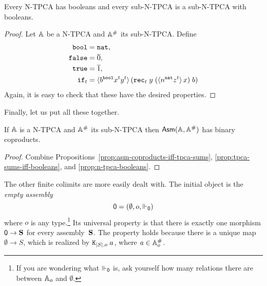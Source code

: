 \begin{proposition}
  \label{prop:n-tpca-booleans}
  Every N-TPCA has booleans and every sub-N-TPCA is a sub-N-TPCA with
  booleans.
\end{proposition}

\begin{proof}
  Let $\AA$ be a N-TPCA and $\compAA$ its sub-N-TPCA. Define
  \begin{align*}
    \ttbool &= \ttnat, \\
    \combFalse &= \numeral{0}, \\
    \combTrue &= \numeral{1}, \\
    \combIf_t &= \pcalam{\annot{b}{\ttbool}
                         \annot{x}{t}
                         \annot{y}{t}}{
                         \combRec_t \; y \;
                         (\xpcalam{\annot{n}{\ttnat} \annot{z}{t}}{x}) \; b 
                       }
  \end{align*}
  Again, it is easy to check that these have the desired properties.
\end{proof}

\noindent
Finally, let us put all these together.

\begin{proposition}
  If $\AA$ is a N-TPCA and $\compAA$ its sub-N-TPCA then $\AsmA$ has
  binary coproducts.
\end{proposition}

\begin{proof}
  Combine Propositions~\ref{prop:asm-coproducts-iff-tpca-sums},
  \ref{prop:tpca-sums-iff-booleans}, and \ref{prop:n-tpca-booleans}.
\end{proof}

The other finite colimits are more easily dealt with. The initial
object is the \emph{empty assembly}
%
\begin{equation*}
  \zero = (\emptyset, o, \rz_\zero)
\end{equation*}
%
where $o$ is any type.\footnote{If you are wondering what $\rz_\zero$
  is, ask yourself how many relations there are between $\Atyp{o}$ and
  $\emptyset$.} Its universal property is that there is exactly one
morphism $\zero \to \asm{S}$ for every assembly~$\asm{S}$. The
property holds because there is a unique map $\emptyset \to S$, which
is realized by $\combK_{|S|,o}\;a$, where $a \in \compAtyp{o}$.


